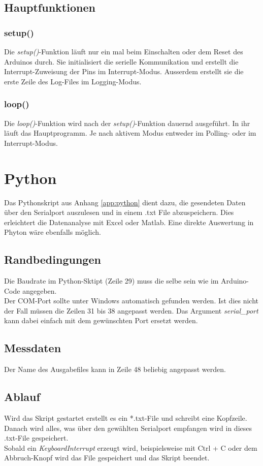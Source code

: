 \subsection{Hauptfunktionen}
\subsubsection{setup()}
Die \textit{setup()}-Funktion läuft nur ein mal beim Einschalten oder dem Reset des Arduinos durch. Sie initialisiert die serielle Kommunikation und erstellt die Interrupt-Zuweisung der Pins im Interrupt-Modus. Ausserdem erstellt sie die erste Zeile des Log-Files im Logging-Modus.\\


\subsubsection{loop()}
Die \textit{loop()}-Funktion wird nach der \textit{setup()}-Funktion dauernd ausgeführt. In ihr läuft das Hauptprogramm. Je nach aktivem Modus entweder im Polling- oder im Interrupt-Modus.

\clearpage

\section{Python}
Das Pythonskript aus Anhang \ref{app:python} dient dazu, die gesendeten Daten über den Serialport auszulesen und in einem .txt File abzuspeichern. Dies erleichtert die Datenanalyse mit Excel oder Matlab. Eine direkte Auswertung in Phyton wäre ebenfalls möglich.\\


\subsection{Randbedingungen}
Die Baudrate im Python-Sktipt (Zeile 29) muss die selbe sein wie im Arduino-Code angegeben.\\
Der COM-Port sollte unter Windows automatisch gefunden werden. Ist dies nicht der Fall müssen die Zeilen 31 bis 38 angepasst werden. Das Argument \textit{serial\_port} kann dabei einfach mit dem gewünschten Port ersetzt werden.\\


\subsection{Messdaten}
Der Name des Ausgabefiles kann in Zeile 48 beliebig angepasst werden.\\


\subsection{Ablauf}
Wird das Skript gestartet erstellt es ein *.txt-File und schreibt eine Kopfzeile.
Danach wird alles, was über den gewählten Serialport empfangen wird in dieses .txt-File gespeichert.\\
Sobald ein \textit{KeyboardInterrupt} erzeugt wird, beispielsweise mit Ctrl + C oder dem Abbruch-Knopf wird das File gespeichert und das Skript beendet.